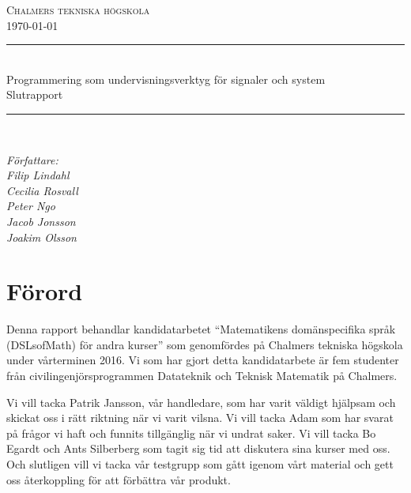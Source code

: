 \documentclass[]{article}
\date{\today}
\begin{document}
\begin{titlepage} \newcommand{\HRule}{\rule{\linewidth}{0.3mm}}
  \center
  \textsc{\Large Chalmers tekniska högskola}\\[0.05cm]
  \normalsize \today

  \HRule \\[0.08cm]
  { \large Programmering som undervisningsverktyg för signaler och system
    \\
    \normalsize{Slutrapport}
  } \\[0.08cm] %
  \HRule \\[0.3cm]

  \vfill

  \begin{flushleft}
    \small
    \emph{Författare:\\
      \quad Filip Lindahl\\
      \quad Cecilia Rosvall\\
      \quad Peter Ngo\\
      \quad Jacob Jonsson\\
      \quad Joakim Olsson\\}
  \end{flushleft}
\end{titlepage}
\newpage

\section*{Förord}
Denna rapport behandlar kandidatarbetet ``Matematikens domänspecifika språk
(DSLsofMath) för andra kurser'' som genomfördes på Chalmers tekniska högskola
 under vårterminen 2016. Vi som har gjort detta kandidatarbete är fem studenter
från civilingenjörsprogrammen Datateknik och Teknisk Matematik på Chalmers.

Vi vill tacka Patrik Jansson, vår handledare, som har varit väldigt hjälpsam
och skickat oss i rätt riktning när vi varit vilsna. Vi vill tacka Adam som
har svarat på frågor vi haft och funnits tillgänglig när vi undrat saker. Vi
vill tacka Bo Egardt och Ants Silberberg som tagit sig tid att diskutera sina
kurser med oss. Och slutligen vill vi tacka vår testgrupp som gått igenom vårt
material och gett oss återkoppling för att förbättra vår produkt.

\newpage
\end{document}
